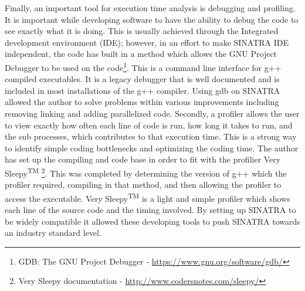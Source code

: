 \indent Finally, an important tool for execution time analysis is debugging and profiling. It is important while developing software to have the ability to debug the code to see exactly what it is doing. This is usually achieved through the Integrated development environment (IDE); however, in an effort to make SINATRA IDE independent, the code has built in a method which allows the GNU Project Debugger to be used on the code\footnote{GDB: The GNU Project Debugger - \url{https://www.gnu.org/software/gdb/}}. This is a command line interface for g++ compiled executables. It is a legacy debugger that is well documented and is included in most installations of the g++ compiler. Using gdb on SINATRA allowed the author to solve problems within various improvements including removing linking and adding parallelized code. Secondly, a profiler allows the user to view exactly how often each line of code is run, how long it takes to run, and the sub processes, which contributes to that execution time. This is a strong way to identify simple coding bottlenecks and optimizing the coding time. The author has set up the compiling and code base in order to fit with the profilier Very Sleepy\textsuperscript{TM} \footnote{Very Sleepy documentation - \url{http://www.codersnotes.com/sleepy/}}. This was completed by determining the version of g++ which the profiler required, compiling in that method, and then allowing the profiler to access the executable. Very Sleepy\textsuperscript{TM} is a light and simple profiler which shows each line of the source code and the timing involved. By setting up SINATRA to be widely compatible it allowed these developing tools to push SINATRA towards an industry standard level. \par



